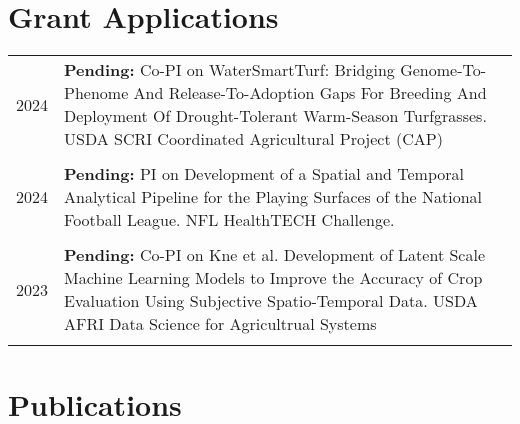 \documentclass[letterpaper,11pt, english]{article}
\begin{document}
\section{Grant Applications}
\begin{flushleft}
  \begin{tabularx}{\textwidth}{@{}lX@{}}
    2024\hspace{1cm} &  \textbf{Pending:} Co-PI on WaterSmartTurf: Bridging Genome-To-Phenome And Release-To-Adoption Gaps For Breeding And Deployment Of Drought-Tolerant Warm-Season Turfgrasses. USDA SCRI Coordinated Agricultural Project (CAP) \\
    \\[-0.2cm]
    2024\hspace{1cm} &  \textbf{Pending:} PI on Development of a Spatial and Temporal Analytical Pipeline for the Playing Surfaces of the National Football League. NFL HealthTECH Challenge. \\
    \\[-0.2cm]
    2023\hspace{1cm} &  \textbf{Pending:} Co-PI on Kne et al. Development of Latent Scale Machine Learning Models to Improve the Accuracy of Crop Evaluation Using Subjective Spatio-Temporal Data. USDA AFRI Data Science for Agricultrual Systems \\
    \\[-0.2cm]
  \end{tabularx}
\end{flushleft}

\section{Publications}
\end{document}
